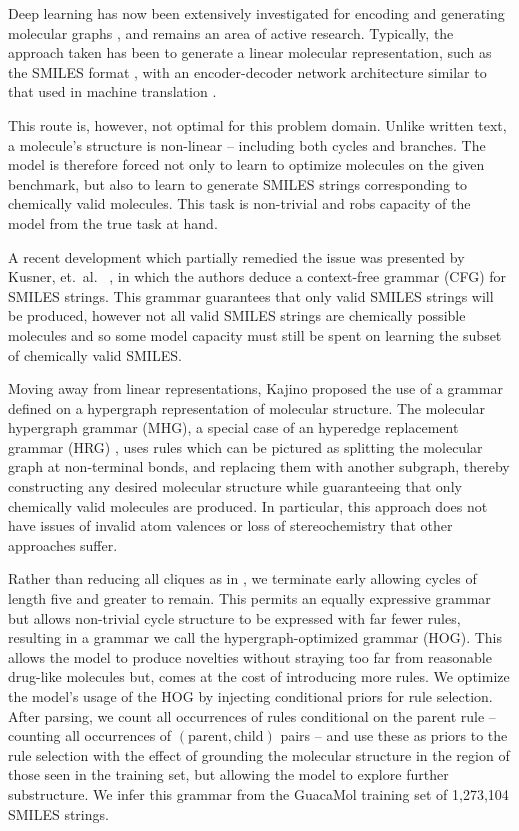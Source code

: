 \documentclass{article}
\begin{document}
Deep learning has now been extensively investigated for encoding and generating molecular graphs \cite{duvenaud2015, kearnes2016, gilmer2017, dai2018, jin2018, simonovsky2018, kusner2017, gomezbombarelli2016, guimaraes2017}, and remains an area of active research. Typically, the approach taken has been to generate a linear molecular representation, such as the SMILES format \cite{weininger1988}, with an encoder-decoder network architecture similar to that used in machine translation \cite{gomezbombarelli2016}.

This route is, however, not optimal for this problem domain. Unlike written text, a molecule's structure is non-linear -- including both cycles and branches. The model is therefore forced not only to learn to optimize molecules on the given benchmark, but also to learn to generate SMILES strings corresponding to chemically valid molecules. This task is non-trivial and robs capacity of the model from the true task at hand.

A recent development which partially remedied the issue was presented by Kusner, et.~al.~ \cite{kusner2017}, in which the authors deduce a context-free grammar (CFG) for SMILES strings. This grammar guarantees that only valid SMILES strings will be produced, however not all valid SMILES strings are chemically possible molecules and so some model capacity must still be spent on learning the subset of chemically valid SMILES.

Moving away from linear representations, Kajino \cite{kajino2018} proposed the use of a grammar defined on a hypergraph representation of molecular structure. The molecular hypergraph grammar (MHG), a special case of an hyperedge replacement grammar (HRG) \cite{drewes1997}, uses rules which can be pictured as splitting the molecular graph at non-terminal bonds, and replacing them with another subgraph, thereby constructing any desired molecular structure while guaranteeing that only chemically valid molecules are produced. In particular, this approach does not have issues of invalid atom valences or loss of stereochemistry that other approaches suffer.

Rather than reducing all cliques as in \cite{kajino2018}, we terminate early allowing cycles of length five and greater to remain. This permits an equally expressive grammar but allows non-trivial cycle structure to be expressed with far fewer rules, resulting in a grammar we call the hypergraph-optimized grammar (HOG). This allows the model to produce novelties without straying too far from reasonable drug-like molecules but, comes at the cost of introducing more rules. We optimize the model's usage of the HOG by injecting conditional priors for rule selection. After parsing, we count all occurrences of rules conditional on the parent rule -- counting all occurrences of $(\text{parent}, \text{child})$ pairs -- and use these as priors to the rule selection with the effect of grounding the molecular structure in the region of those seen in the training set, but allowing the model to explore further substructure. We infer this grammar from the GuacaMol \cite{pogany2019} training set of 1,273,104 SMILES strings.
\end{document}
